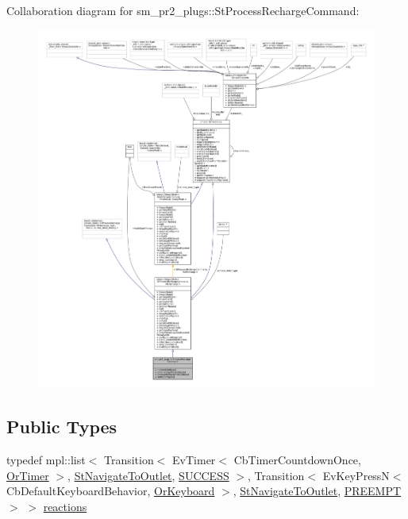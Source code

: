 Collaboration diagram for sm\+\_\+pr2\+\_\+plugs\+:\+:St\+Process\+Recharge\+Command\+:
\nopagebreak
\begin{figure}[H]
\begin{center}
\leavevmode
\includegraphics[width=350pt]{structsm__pr2__plugs_1_1StProcessRechargeCommand__coll__graph}
\end{center}
\end{figure}
\subsection*{Public Types}
\begin{DoxyCompactItemize}
\item 
typedef mpl\+::list$<$ Transition$<$ Ev\+Timer$<$ Cb\+Timer\+Countdown\+Once, \hyperlink{classsm__pr2__plugs_1_1OrTimer}{Or\+Timer} $>$, \hyperlink{structsm__pr2__plugs_1_1StNavigateToOutlet}{St\+Navigate\+To\+Outlet}, \hyperlink{classSUCCESS}{S\+U\+C\+C\+E\+SS} $>$, Transition$<$ Ev\+Key\+PressN$<$ Cb\+Default\+Keyboard\+Behavior, \hyperlink{classsm__pr2__plugs_1_1OrKeyboard}{Or\+Keyboard} $>$, \hyperlink{structsm__pr2__plugs_1_1StNavigateToOutlet}{St\+Navigate\+To\+Outlet}, \hyperlink{classPREEMPT}{P\+R\+E\+E\+M\+PT} $>$ $>$ \hyperlink{structsm__pr2__plugs_1_1StProcessRechargeCommand_a518876250b66fbe9f710fa42da8f51cb}{reactions}
\end{DoxyCompactItemize}
